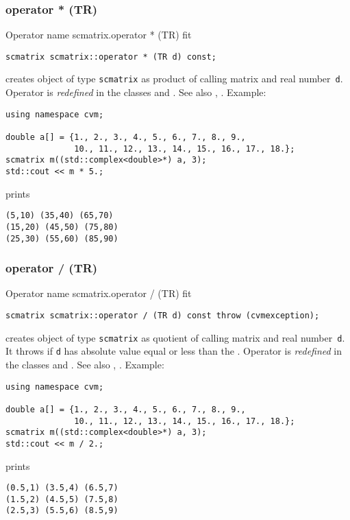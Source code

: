 \subsubsection{operator * (TR)}
Operator%
\pdfdest name {scmatrix.operator * (TR)} fit
\begin{verbatim}
scmatrix scmatrix::operator * (TR d) const;
\end{verbatim}
creates  object of type \verb"scmatrix" as  product of
 calling matrix and  real number~\verb"d".
Operator is \emph{redefined} in the classes
and .
See also ,
.
Example:
\begin{Verbatim}
using namespace cvm;

double a[] = {1., 2., 3., 4., 5., 6., 7., 8., 9.,
              10., 11., 12., 13., 14., 15., 16., 17., 18.};
scmatrix m((std::complex<double>*) a, 3);
std::cout << m * 5.;
\end{Verbatim}
prints
\begin{Verbatim}
(5,10) (35,40) (65,70)
(15,20) (45,50) (75,80)
(25,30) (55,60) (85,90)
\end{Verbatim}
\newpage



\subsubsection{operator / (TR)}
Operator%
\pdfdest name {scmatrix.operator / (TR)} fit
\begin{verbatim}
scmatrix scmatrix::operator / (TR d) const throw (cvmexception);
\end{verbatim}
creates  object of type \verb"scmatrix" as  quotient of
 calling matrix and  real number~\verb"d". It throws
if \verb"d" has  absolute value equal or less than the
.
Operator is \emph{redefined} in the classes
and .
See also ,
.
Example:
\begin{Verbatim}
using namespace cvm;

double a[] = {1., 2., 3., 4., 5., 6., 7., 8., 9.,
              10., 11., 12., 13., 14., 15., 16., 17., 18.};
scmatrix m((std::complex<double>*) a, 3);
std::cout << m / 2.;
\end{Verbatim}
prints
\begin{Verbatim}
(0.5,1) (3.5,4) (6.5,7)
(1.5,2) (4.5,5) (7.5,8)
(2.5,3) (5.5,6) (8.5,9)
\end{Verbatim}
\newpage



